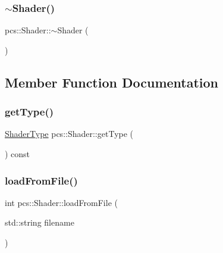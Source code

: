 \mbox{\label{classpcs_1_1Shader_ae29be85176bf296e0b59da4e88f52ba4}} 
\subsubsection{\texorpdfstring{$\sim$\+Shader()}{~Shader()}}
{\footnotesize\ttfamily pcs\+::\+Shader\+::$\sim$\+Shader (\begin{DoxyParamCaption}{ }\end{DoxyParamCaption})}



\subsection{Member Function Documentation}
\mbox{\label{classpcs_1_1Shader_ab2846a8669b4fa1904c921fa1d4bf083}} 
\subsubsection{\texorpdfstring{get\+Type()}{getType()}}
{\footnotesize\ttfamily \hyperlink{namespacepcs_a2f6dfe5fadf3611302a9b7259502c3c9}{Shader\+Type} pcs\+::\+Shader\+::get\+Type (\begin{DoxyParamCaption}{ }\end{DoxyParamCaption}) const\hspace{0.3cm}{\ttfamily [inline]}}

\mbox{\label{classpcs_1_1Shader_a3fd3e303b35dc54cb68c7b8693529892}} 
\subsubsection{\texorpdfstring{load\+From\+File()}{loadFromFile()}}
{\footnotesize\ttfamily int pcs\+::\+Shader\+::load\+From\+File (\begin{DoxyParamCaption}\item[{std\+::string}]{filename }\end{DoxyParamCaption})}

